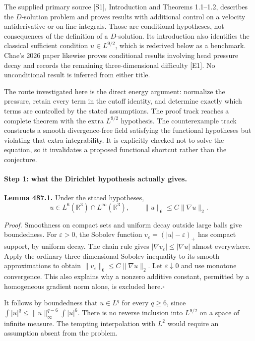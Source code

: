 \documentclass[11pt]{article}
\begin{document}
The supplied primary source [S1], Introduction and Theorems 1.1--1.2,
describes the $D$-solution problem and proves results with additional
control on a velocity antiderivative or on line integrals. Those are
conditional hypotheses, not consequences of the definition of a
$D$-solution. Its introduction also identifies the classical sufficient
condition $u\in L^{9/2}$, which is rederived below as a benchmark.
Chae's 2026 paper likewise proves conditional results involving head
pressure decay and records the remaining three-dimensional difficulty
[E1]. No unconditional result is inferred from either title.

The route investigated here is the direct energy argument: normalize the
pressure, retain every term in the cutoff identity, and determine exactly
which terms are controlled by the stated assumptions. The proof track
reaches a complete theorem with the extra $L^{9/2}$ hypothesis. The
counterexample track constructs a smooth divergence-free field satisfying
the functional hypotheses but violating that extra integrability. It is
explicitly checked not to solve the equation, so it invalidates a proposed
functional shortcut rather than the conjecture.

\paragraph{Step 1: what the Dirichlet hypothesis actually gives.}
\textbf{Lemma 487.1.} Under the stated hypotheses,
\[
 u\in L^6(\mathbb R^3)\cap L^\infty(\mathbb R^3),
 \qquad \|u\|_6\leq C\|\nabla u\|_2.
\]

\emph{Proof.}
Smoothness on compact sets and uniform decay outside large balls give
boundedness. For $\varepsilon>0$, the Sobolev function
$v_\varepsilon=(|u|-\varepsilon)_+$ has compact support, by uniform
decay. The chain rule gives
$|\nabla v_\varepsilon|\leq|\nabla u|$ almost everywhere. Apply the
ordinary three-dimensional Sobolev inequality to its smooth
approximations to obtain
$\|v_\varepsilon\|_6\leq C\|\nabla u\|_2$.
Let $\varepsilon\downarrow0$ and use monotone convergence.
This also explains why a nonzero additive constant, permitted by a
homogeneous gradient norm alone, is excluded here.\hfill$\square$

It follows by boundedness that $u\in L^q$ for every $q\geq6$, since
$\int|u|^q\leq\|u\|_\infty^{q-6}\int|u|^6$.
There is no reverse inclusion into $L^{9/2}$ on a space of infinite
measure. The tempting interpolation with $L^2$ would require an
assumption absent from the problem.
\end{document}
